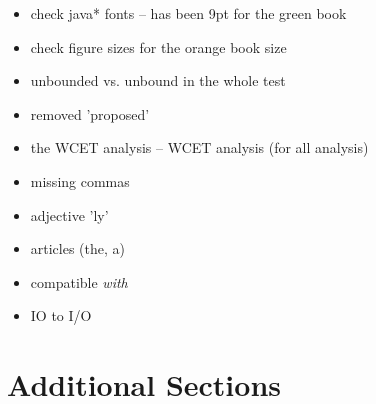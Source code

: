 \begin{itemize}
  \item check java* fonts -- has been 9pt for the green book
  \item check figure sizes for the orange book size
  \item unbounded vs. unbound in the whole test
  \item removed 'proposed'
  \item the WCET analysis -- WCET analysis (for all analysis)
  \item missing commas
  \item adjective 'ly'
  \item articles (the, a)
  \item compatible \emph{with}
  \item IO to I/O
\end{itemize}

\section{Additional Sections}

